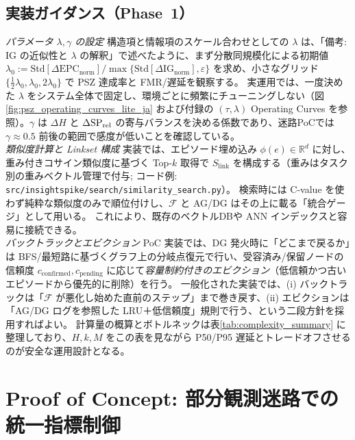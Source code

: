 \documentclass[ja=standard,xelatex]{bxjsarticle}
\newcommand{\F}{\mathcal{F}}
\newcommand{\gednorm}{\Delta\mathrm{EPC}_{\mathrm{norm}}}
\newcommand{\ignorm}{\Delta\mathrm{IG}_{\mathrm{norm}}}
\begin{document}
\subsection{実装ガイダンス（Phase~1）}
\noindent\textit{パラメータ $\lambda,\gamma$ の設定}\; 構造項と情報項のスケール合わせとしての $\lambda$ は、「備考: IG の近似性と $\lambda$ の解釈」で述べたように、まず分散同規模化による初期値 $\lambda_0:=\mathrm{Std}[\gednorm]/\max\{\mathrm{Std}[\ignorm],\varepsilon\}$ を求め、小さなグリッド $\{\tfrac{1}{2}\lambda_0,\lambda_0,2\lambda_0\}$ で PSZ 達成率と FMR/遅延を観察する。
実運用では、一度決めた $\lambda$ をシステム全体で固定し、環境ごとに頻繁にチューニングしない（図\ref{fig:psz_operating_curves_lite_ja} および付録の $(\tau,\lambda)$ Operating Curves を参照）。$\gamma$ は $\Delta H$ と $\Delta\mathrm{SP}_{\rm rel}$ の寄与バランスを決める係数であり、迷路PoCでは $\gamma{\approx}0.5$ 前後の範囲で感度が低いことを確認している。
\\
\noindent\textit{類似度計算と Linkset 構成}\; 実装では、エピソード埋め込み $\phi(e)\in\mathbb{R}^d$ に対し、重み付きコサイン類似度に基づく Top-$k$ 取得で $S_{\mathrm{link}}$ を構成する（重みはタスク別の重みベクトル管理で付与; コード例: \texttt{src/insightspike/search/similarity\_search.py}）。
検索時には C-value を使わず純粋な類似度のみで順位付けし、$\F$ と AG/DG はその上に載る「統合ゲージ」として用いる。
これにより、既存のベクトルDBや ANN インデックスと容易に接続できる。
\\
\noindent\textit{バックトラックとエビクション}\; PoC 実装では、DG 発火時に「どこまで戻るか」は BFS/最短路に基づくグラフ上の分岐点復元で行い、受容済み/保留ノードの信頼度 $c_{\mathrm{confirmed}},c_{\mathrm{pending}}$ に応じて\emph{容量制約付きのエビクション}（低信頼かつ古いエピソードから優先的に削除）を行う。
一般化された実装では、(i) バックトラックは「$\F$ が悪化し始めた直前のステップ」まで巻き戻す、(ii) エビクションは「AG/DG ログを参照した LRU＋低信頼度」規則で行う、という二段方針を採用すればよい。
計算量の概算とボトルネックは表\ref{tab:complexity_summary} に整理しており、$H,k,M$ をこの表を見ながら P50/P95 遅延とトレードオフさせるのが安全な運用設計となる。


\section{Proof of Concept: 部分観測迷路での統一指標制御}
\label{sec:maze_experiment}
\end{document}

